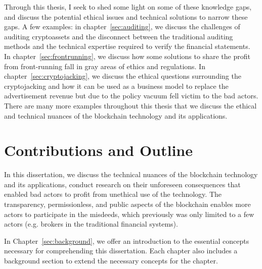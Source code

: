 Through this thesis, I seek to shed some light on some of these knowledge gaps, and discuss the potential ethical issues and technical solutions to narrow these gaps. A few examples: in chapter~\ref{sec:auditing}, we discuss the challenges of auditing cryptoassets and the disconnect between the traditional auditing methods and the technical expertise required to verify the financial statements. In chapter~\ref{sec:frontrunning}, we discuss how some solutions to share the profit from front-running fall in gray areas of ethics and regulations. In chapter~\ref{sec:cryptojacking}, we discuss the ethical questions surrounding the cryptojacking and how it can be used as a business model to replace the advertisement revenue but due to the policy vacuum fell victim to the bad actors. There are many more examples throughout this thesis that we discuss the ethical and technical nuances of the blockchain technology and its applications.

\section{Contributions and Outline} 

In this dissertation, we discuss the technical nuances of the blockchain technology and its applications, conduct research on their unforeseen consequences that enabled bad actors to profit from unethical use of the technology. The transparency, permissionless, and public aspects of the blockchain enables more actors to participate in the misdeeds, which previously was only limited to a few actors (e.g. brokers in the traditional financial systems). 

In Chapter~\ref{sec:background}, we offer an introduction to the essential concepts necessary for comprehending this dissertation. Each chapter also includes a background section to extend the necessary concepts for the chapter.

